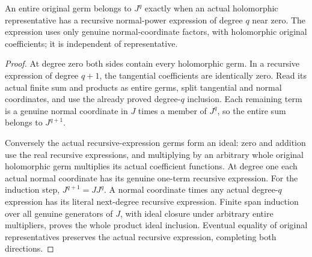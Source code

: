 \begin{lemma}
\label{hir:relative-normal-actual-recursive-power-dictionary}
\leanok
An entire original germ belongs to $J^q$ exactly when an actual holomorphic
representative has a recursive normal-power expression of degree $q$ near
zero. The expression uses only genuine normal-coordinate factors, with
holomorphic original coefficients; it is independent of representative.
\end{lemma}
\begin{proof}
At degree zero both sides contain every holomorphic germ. In a recursive
expression of degree $q+1$, the tangential coefficients are identically zero.
Read its actual finite sum and products as entire germs, split tangential and
normal coordinates, and use the already proved degree-$q$ inclusion. Each
remaining term is a genuine normal coordinate in $J$ times a member of $J^q$,
so the entire sum belongs to $J^{q+1}$.

Conversely the actual recursive-expression germs form an ideal: zero and
addition use the real recursive expressions, and multiplying by an arbitrary
whole original holomorphic germ multiplies its actual coefficient functions.
At degree one each actual normal coordinate has its genuine one-term
recursive expression. For the induction step, $J^{q+1}=JJ^q$. A normal
coordinate times any actual degree-$q$ expression has its literal next-degree
recursive expression. Finite span induction over all genuine generators of
$J$, with ideal closure under arbitrary entire multipliers, proves the whole
product ideal inclusion. Eventual equality of original representatives
preserves the actual recursive expression, completing both directions.
\end{proof}

